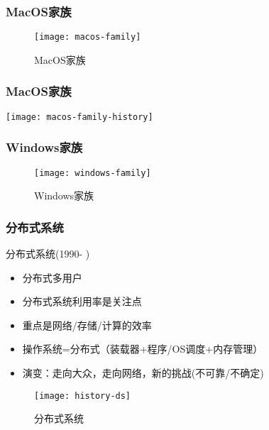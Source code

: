 \begin{frame}[plain]
    
    \frametitle{MacOS家族}
    
    \begin{figure}
        \centering
        \texttt{[image: macos-family]}
        \caption{MacOS家族}
    \end{figure}
    
\end{frame}
\begin{frame}[plain]
    
    \frametitle{MacOS家族}
    
    \texttt{[image: macos-family-history]}
    
\end{frame}

\begin{frame}
    
    \frametitle{Windows家族}
    
    \begin{figure}
        \centering
        \texttt{[image: windows-family]}
        \caption{Windows家族}
    \end{figure}
    
\end{frame}

\begin{frame}[plain]
	
	\frametitle{分布式系统}
	
	分布式系统(1990- )

	\begin{itemize}
		\item 分布式多用户
		\item 分布式系统利用率是关注点	
		\item 重点是网络/存储/计算的效率
		\item 操作系统=分布式（装载器+程序/OS调度+内存管理）
		\item 演变：走向大众，走向网络，新的挑战(不可靠/不确定)
	\end{itemize}
	
	\begin{figure}
		\centering
		\texttt{[image: history-ds]}
		\caption{分布式系统}
	\end{figure}
	
\end{frame}

